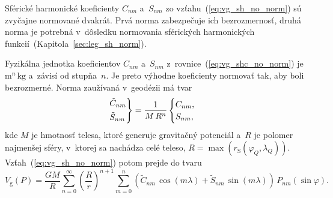 \documentclass[a4paper,12pt]{book}
\newcommand{\gidx}{\mathrm g}
\begin{document}
Sférické harmonické koeficienty $C_{nm}$ a~$S_{nm}$ zo
vzťahu~(\ref{eq:vg_sh_no_norm}) sú zvyčajne normované dvakrát.  Prvá norma
zabezpečuje ich bezrozmernosť, druhá norma je potrebná v~dôsledku normovania 
sférických harmonických funkcií~(Kapitola~\ref{sec:leg_sh_norm}).

Fyzikálna jednotka koeficientov $C_{nm}$ a~$S_{nm}$
z~rovnice~(\ref{eq:vg_shc_no_norm}) je $\mathrm{m}^n \, \mathrm{kg}$ a~závisí 
od stupňa~$n$.  Je preto výhodne koeficienty normovať tak, aby boli
bezrozmerné.  Norma zaužívaná v~geodézii má tvar
%
\begin{equation}
\label{eq:cnm_snm_1st_norm}
\begin{rcases}
\tilde{C}_{nm}\\
\tilde{S}_{nm}
\end{rcases}
= \frac{1}{M \, R^n}
\begin{cases}
C_{nm}{,}\\
S_{nm}{,}
\end{cases}
\end{equation}
%
kde $M$ je hmotnosť telesa, ktoré generuje gravitačný potenciál a~$R$ je
polomer najmenšej sféry, v~ktorej sa nachádza celé teleso, $R
= \max(r_\mathrm{S}(\varphi_Q, \lambda_Q))$.  Vzťah~(\ref{eq:vg_sh_no_norm})
potom prejde do tvaru
%
\begin{equation}
\label{eq:vg_sh_1st_norm}
V_\gidx(P) = \frac{GM}{R} \sum_{n = 0}^\infty \left( \frac{R}{r} \right)^{n
+ 1} \sum_{m = 0}^{n} \left( \tilde{C}_{nm} \, \cos(m\lambda) + \tilde{S}_{nm}
\, \sin(m\lambda)\right) \, P_{nm}(\sin\varphi){.}
\end{equation}
\end{document}
